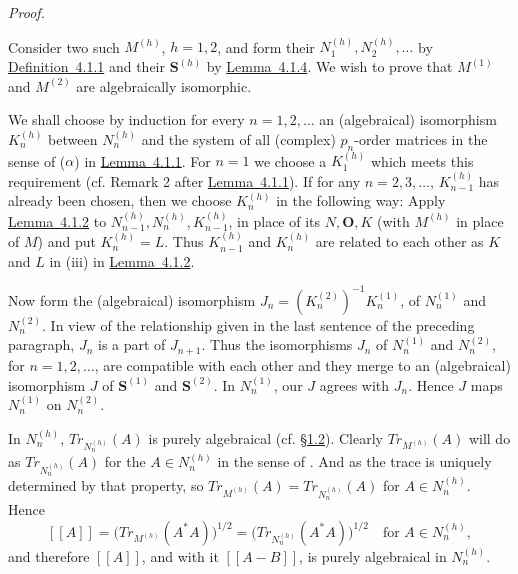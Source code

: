\documentclass[b5paper,twoside]{article}
\newcommand{\secref}[2]{\hyperref[#1]{\mbox{\S#2}}}
\newcommand{\lemref}[2]{\hyperref[#1]{\mbox{Lemma~#2}}}
\newcommand{\defref}[2]{\hyperref[#1]{\mbox{Definition~#2}}}
\theoremstyle{mvnplain}
\renewenvironment{proof}[1][Proof]{%
  \par\addvspace{0.35\baselineskip}%
  \noindent\textit{#1.}\ \normalfont\ignorespaces
}{%
  \par\addvspace{0.35\baselineskip}%
}
\newcommand{\M}{\mathbf M}
\newcommand{\N}{\mathbf N}
\newcommand{\Metric}[1]{\left[\!\left[#1\right]\!\right]}
\def\M{M}%
\def\N{N}%
\def\Metric#1{[[#1]]}%
\def\operatorname#1{#1}%
\def\mathfrak#1{#1}%
\begin{document}
\begin{proof}
Consider two such \(\M^{(h)}\), \(h=1,2\), and form their
\(\N_1^{(h)},\N_2^{(h)},\ldots\) by \defref{def:4.1.1}{4.1.1} and their
\(\mathbf S^{(h)}\) by \lemref{lem:4.1.4}{4.1.4}. We wish to prove that
\(\M^{(1)}\) and \(\M^{(2)}\) are algebraically isomorphic.

We shall choose by induction for every \(n=1,2,\ldots\) an (algebraical)
isomorphism \(\mathfrak K_n^{(h)}\) between \(\N_n^{(h)}\) and the system of
all (complex) \(p_n\)-order matrices in the sense of (\(\alpha\)) in
\lemref{lem:4.1.1}{4.1.1}. For \(n=1\) we choose a \(\mathfrak K_1^{(h)}\)
which meets this requirement (cf. Remark 2 after
\lemref{lem:4.1.1}{4.1.1}). If for any \(n=2,3,\ldots\),
\(\mathfrak K_{n-1}^{(h)}\) has already been chosen, then we choose
\(\mathfrak K_n^{(h)}\) in the following way: Apply
\lemref{lem:4.1.2}{4.1.2} to \(\N_{n-1}^{(h)},\N_n^{(h)},
\mathfrak K_{n-1}^{(h)}\), in place of its \(\N,\mathbf O,\mathfrak K\)
(with \(\M^{(h)}\) in place of \(\M\)) and put
\(\mathfrak K_n^{(h)}=\mathfrak L\). Thus \(\mathfrak K_{n-1}^{(h)}\) and
\(\mathfrak K_n^{(h)}\) are related to each other as \(\mathfrak K\) and
\(\mathfrak L\) in (iii) in \lemref{lem:4.1.2}{4.1.2}.

Now form the (algebraical) isomorphism
\(\mathfrak J_n=(\mathfrak K_n^{(2)})^{-1}\mathfrak K_n^{(1)}\), of
\(\N_n^{(1)}\) and \(\N_n^{(2)}\). In view of the relationship given in the
last sentence of the preceding paragraph, \(\mathfrak J_n\) is a part of
\(\mathfrak J_{n+1}\). Thus the isomorphisms \(\mathfrak J_n\) of
\(\N_n^{(1)}\) and \(\N_n^{(2)}\), for \(n=1,2,\ldots\), are compatible with
each other and they merge to an (algebraical) isomorphism \(\mathfrak J\) of
\(\mathbf S^{(1)}\) and \(\mathbf S^{(2)}\). In \(\N_n^{(1)}\), our
\(\mathfrak J\) agrees with \(\mathfrak J_n\). Hence \(\mathfrak J\) maps
\(\N_n^{(1)}\) on \(\N_n^{(2)}\).

In \(\N_n^{(h)}\), \(\operatorname {Tr}_{\N_n^{(h)}}(A)\) is purely
algebraical (cf. \secref{sec:1.2}{1.2}). Clearly
\(\operatorname {Tr}_{\M^{(h)}}(A)\) will do as
\(\operatorname {Tr}_{\N_n^{(h)}}(A)\) for the \(A\in\N_n^{(h)}\) in the
sense of \cite[p.~219, property~IV]{ref6}. And as the trace is uniquely
determined by that property, so
\(\operatorname {Tr}_{\M^{(h)}}(A)=\operatorname {Tr}_{\N_n^{(h)}}(A)\) for
\(A\in\N_n^{(h)}\). Hence
\[
  \Metric{A}
  =\bigl(\operatorname {Tr}_{\M^{(h)}}(A^*A)\bigr)^{1/2}
  =\bigl(\operatorname {Tr}_{\N_n^{(h)}}(A^*A)\bigr)^{1/2}
  \quad\text{for }A\in\N_n^{(h)},
\]
and therefore \(\Metric{A}\), and with it \(\Metric{A-B}\), is purely
algebraical in \(\N_n^{(h)}\).


\end{proof}
\end{document}
